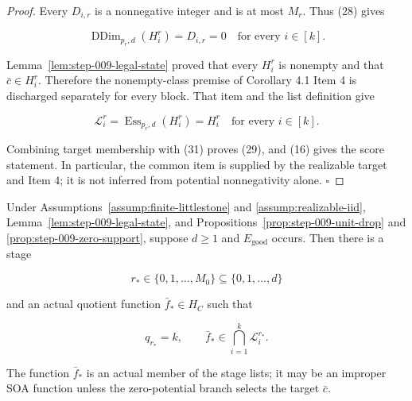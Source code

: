 \begin{proof}
Every \(D_{i,r}\) is a nonnegative integer and is at most \(M_r\). Thus
(28) gives

\[
 \operatorname{DDim}_{p_r,d}(H_i^r)=D_{i,r}=0
 \quad\text{for every }i\in[k].
 \tag{30}
\]

Lemma~\ref{lem:step-009-legal-state} proved that every \(H_i^r\) is
nonempty and that \(\bar c\in H_i^r\). Therefore the nonempty-class premise
of Corollary 4.1 Item 4 is discharged separately for every block. That item
and the  list definition give

\[
 \mathcal L_i^r
 =\operatorname{Ess}_{p_r,d}(H_i^r)
 =H_i^r
 \quad\text{for every }i\in[k].
 \tag{31}
\]

Combining target membership with (31) proves (29), and (16) gives the
score statement. In particular, the common item is supplied by the
realizable target and Item 4; it is not inferred from potential
nonnegativity alone. \(\square\)


\end{proof}

\begin{proposition}\label{prop:step-009-termination}
Under Assumptions~\ref{assump:finite-littlestone} and
\ref{assump:realizable-iid}, Lemma~\ref{lem:step-009-legal-state}, and
Propositions~\ref{prop:step-009-unit-drop} and
\ref{prop:step-009-zero-support}, suppose \(d\ge1\) and
\(E_{\mathrm{good}}\) occurs. Then there is a stage

\[
 r_*\in\{0,1,\ldots,M_0\}\subseteq\{0,1,\ldots,d\}
 \tag{32}
\]

and an actual quotient function \(\bar f_*\in H_C\) such that

\[
 q_{r_*}=k,
 \qquad
 \bar f_*\in\bigcap_{i=1}^k\mathcal L_i^{r_*}.
 \tag{33}
\]

The function \(\bar f_*\) is an actual member of the stage lists; it may
be an improper SOA function unless the zero-potential branch selects the
target \(\bar c\).


\end{proposition}

